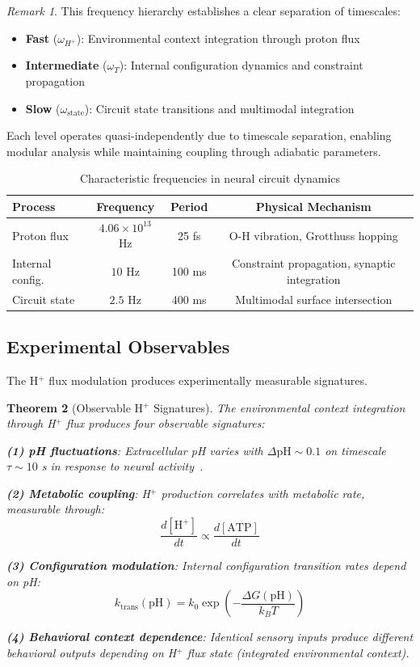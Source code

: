 \documentclass[aps,prd,twocolumn,superscriptaddress,floatfix,nofootinbib]{revtex4-2}
\newtheorem{theorem}{Theorem}[section]
\theoremstyle{remark}
\newtheorem{remark}[theorem]{Remark}
\begin{document}
\begin{remark}
This frequency hierarchy establishes a clear separation of timescales:
\begin{itemize}
\item \textbf{Fast} ($\omega_{H^+}$): Environmental context integration through proton flux
\item \textbf{Intermediate} ($\omega_T$): Internal configuration dynamics and constraint propagation
\item \textbf{Slow} ($\omega_{\text{state}}$): Circuit state transitions and multimodal integration
\end{itemize}

Each level operates quasi-independently due to timescale separation, enabling modular analysis while maintaining coupling through adiabatic parameters.
\end{remark}

\begin{table}[h]
\centering
\caption{Characteristic frequencies in neural circuit dynamics}
\label{tab:frequencies}
\begin{tabular}{@{}lccc@{}}
\toprule
Process & Frequency & Period & Physical Mechanism \\
\midrule
Proton flux & $4.06 \times 10^{13}$ Hz & 25 fs & O-H vibration, Grotthuss hopping \\
Internal config. & $10$ Hz & 100 ms & Constraint propagation, synaptic integration \\
Circuit state & $2.5$ Hz & 400 ms & Multimodal surface intersection \\
\bottomrule
\end{tabular}
\end{table}

\subsection{Experimental Observables}

The H$^+$ flux modulation produces experimentally measurable signatures.

\begin{theorem}[Observable H$^+$ Signatures]
\label{thm:hplus_observables}
The environmental context integration through H$^+$ flux produces four observable signatures:

\textbf{(1) pH fluctuations}: Extracellular pH varies with $\Delta \text{pH} \sim 0.1$ on timescale $\tau \sim 10$ s in response to neural activity~\cite{chesler2003regulation}.

\textbf{(2) Metabolic coupling}: H$^+$ production correlates with metabolic rate, measurable through:
$$
\frac{d[\text{H}^+]}{dt} \propto \frac{d[\text{ATP}]}{dt}
$$

\textbf{(3) Configuration modulation}: Internal configuration transition rates depend on pH:
$$
k_{\text{trans}}(\text{pH}) = k_0 \exp\left(-\frac{\Delta G(\text{pH})}{k_B T}\right)
$$

\textbf{(4) Behavioral context dependence}: Identical sensory inputs produce different behavioral outputs depending on H$^+$ flux state (integrated environmental context).
\end{theorem}
\end{document}
